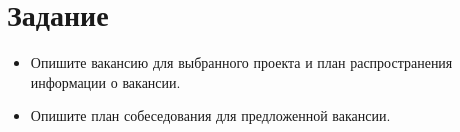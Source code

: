 \documentclass[14pt, russian]{matmex-diploma-custom}
\begin{document}

\maketitle

\section*{Задание}
\begin{itemize}
    \item Опишите вакансию для выбранного проекта и план распространения информации о вакансии.
    \item Опишите план собеседования для предложенной вакансии.
\end{itemize}
\end{document}
